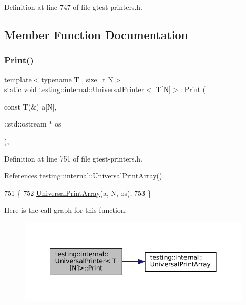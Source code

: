 Definition at line 747 of file gtest-\/printers.\+h.



\subsection{Member Function Documentation}
\mbox{\label{classtesting_1_1internal_1_1UniversalPrinter_3_01T[N]_4_a1cf0e7c8db59c090f769116c6421b212}} 
\subsubsection{\texorpdfstring{Print()}{Print()}}
{\footnotesize\ttfamily template$<$typename T , size\+\_\+t N$>$ \\
static void \hyperlink{classtesting_1_1internal_1_1UniversalPrinter}{testing\+::internal\+::\+Universal\+Printer}$<$ T\mbox{[}N\mbox{]}$>$\+::Print (\begin{DoxyParamCaption}\item[{const T(\&)}]{a\mbox{[}\+N\mbox{]},  }\item[{\+::std\+::ostream $\ast$}]{os }\end{DoxyParamCaption})\hspace{0.3cm}{\ttfamily [inline]}, {\ttfamily [static]}}



Definition at line 751 of file gtest-\/printers.\+h.



References testing\+::internal\+::\+Universal\+Print\+Array().


\begin{DoxyCode}
751                                                      \{
752     \hyperlink{namespacetesting_1_1internal_ad79d71c3110f8eb24ab352d68f29436a}{UniversalPrintArray}(a, N, os);
753   \}
\end{DoxyCode}
Here is the call graph for this function\+:
\nopagebreak
\begin{figure}[H]
\begin{center}
\leavevmode
\includegraphics[width=341pt]{classtesting_1_1internal_1_1UniversalPrinter_3_01T[N]_4_a1cf0e7c8db59c090f769116c6421b212_cgraph}
\end{center}
\end{figure}


